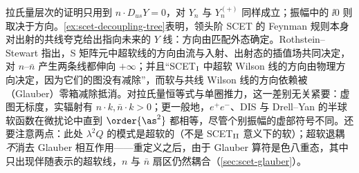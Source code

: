 \begin{remark}[$Y_n$ 的方向与 $\ii0$]\label{rem:scet-y-direction}
拉氏量层次的证明只用到 $n\cdot D_{us}Y=0$，对 $Y_n$ 与 $Y_n^{(+)}$ 同样成立；振幅中的 $\ii0$ 则取决于方向。\cref{ex:scet-decoupling-tree}表明，领头阶 SCET 的 Feynman 规则本身对出射的共线夸克给出指向未来的 $Y$ 线\cite{Chay:2004zn}：方向由匹配外态确定。Rothstein--Stewart 指出，S 矩阵元中超软线的方向由流与入射、出射态的插值场共同决定，对 $n$–$\bar n$ 产生两条线都伸向 $+\infty$\cite[第~10.1~节]{RothsteinStewart2016}；并且“SCET$_{\rm I}$ 中超软 Wilson 线的方向由物理方向决定，因为它们的图没有减除”，而软与共线 Wilson 线的方向依赖被（Glauber）零箱减除抵消\cite[第~4.2~节]{RothsteinStewart2016}。对拉氏量恒等式与单圈推力，这一差别无关紧要：虚图无标度，实辐射有 $n\cdot k,\bar n\cdot k>0$；更一般地，$e^+e^-$、DIS 与 Drell--Yan 的半球软函数在微扰论中直到 $\order{\as^2}$ 都相等，尽管个别振幅的虚部符号不同\cite{Kang:2015moa}。还要注意两点：此处 $\lambda^2Q$ 的模式是超软的（不是 SCET$_{\rm II}$ 意义下的软）；超软退耦\emph{不}消去 Glauber 相互作用——重定义之后，由于 Glauber 算符是色八重态，其中只出现伴随表示的超软线，$n$ 与 $\bar n$ 扇区仍然耦合\cite[第~5.1~节]{RothsteinStewart2016}（\cref{sec:scet-glauber}）。
\end{remark}

